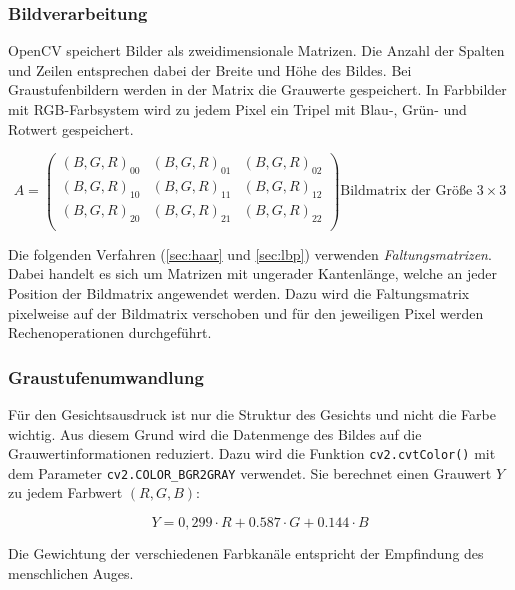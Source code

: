 \documentclass[12pt, a4paper]{article}
\begin{document}
\subsubsection{Bildverarbeitung}
OpenCV speichert Bilder als zweidimensionale Matrizen. Die Anzahl der Spalten und Zeilen entsprechen dabei der Breite und Höhe des Bildes. Bei Graustufenbildern werden in der Matrix die Grauwerte gespeichert. In Farbbilder mit RGB-Farbsystem wird zu jedem Pixel ein Tripel mit Blau-, Grün- und Rotwert gespeichert.

\[
A =
\begin{pmatrix}
(B, G, R)_{00} & (B, G, R)_{01} & (B, G, R)_{02} \\
(B, G, R)_{10} & (B, G, R)_{11} & (B, G, R)_{12} \\
(B, G, R)_{20} & (B, G, R)_{21} & (B, G, R)_{22} \\
\end{pmatrix}
\text{Bildmatrix der Größe \(3 \times 3\)}
\]

Die folgenden Verfahren (\ref{sec:haar} und \ref{sec:lbp}) verwenden \textit{Faltungsmatrizen}. Dabei handelt es sich um Matrizen mit ungerader Kantenlänge, welche an jeder Position der Bildmatrix angewendet werden. Dazu wird die Faltungsmatrix pixelweise auf der Bildmatrix verschoben und für den jeweiligen Pixel werden Rechenoperationen durchgeführt.

\subsubsection{Graustufenumwandlung}
Für den Gesichtsausdruck ist nur die Struktur des Gesichts und nicht die Farbe wichtig. Aus diesem Grund wird die Datenmenge des Bildes auf die Grauwertinformationen reduziert. Dazu wird die Funktion \lstinline{cv2.cvtColor()} \cite{opencv:cvtcolor} mit dem Parameter \lstinline{cv2.COLOR_BGR2GRAY} verwendet. Sie berechnet einen Grauwert \(Y\) zu jedem Farbwert \((R, G, B)\):

\[Y = 0,299 \cdot R + 0.587 \cdot G + 0.144 \cdot B\]

Die Gewichtung der verschiedenen Farbkanäle entspricht der Empfindung des menschlichen Auges.\cite{wikipedia:grauwert}
\end{document}
